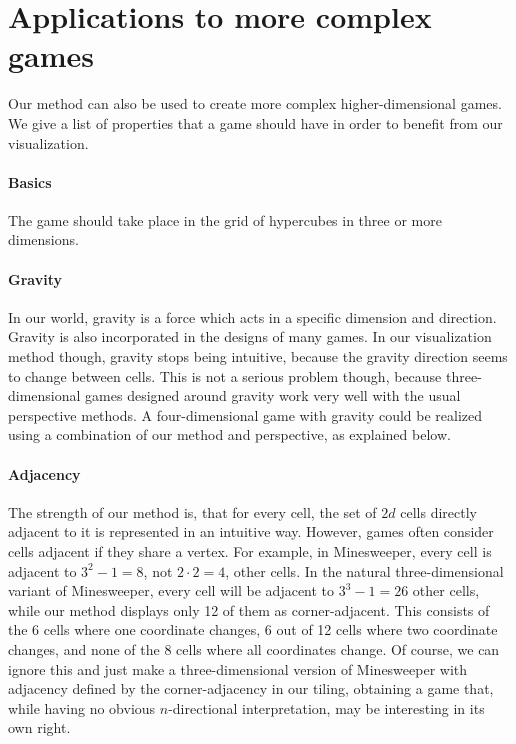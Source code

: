 \documentclass{article}
\begin{document}
\section{Applications to more complex games}

Our method can also be used to create more complex higher-dimensional games.
We give a list of properties that a game should have in order to benefit from our visualization.

\paragraph{Basics} The game should take place in the grid of hypercubes in three or more dimensions.

\paragraph{Gravity} In our world, gravity is a force which acts in a specific dimension and direction.
Gravity is also incorporated in the designs of many games. In our visualization method though, gravity
stops being intuitive, because the gravity direction seems to change between cells. This is not a
serious problem though, because three-dimensional games designed around gravity work very well with the usual
perspective methods. A four-dimensional game with gravity could be realized using a combination of our method and
perspective, as explained below.

\paragraph{Adjacency} The strength of our method is, that for every cell, the set of $2d$ cells directly adjacent
to it is represented in an intuitive way. However, games often consider cells adjacent if they share a vertex.
For example, in Minesweeper, every cell is adjacent to $3^2-1 = 8$, not $2\cdot 2=4$, other cells. In the natural
three-dimensional variant of Minesweeper, every cell will be adjacent to $3^3-1 = 26$ other cells, while our
method displays only 12 of them as corner-adjacent. This consists of the 6 cells where one coordinate changes,
6 out of 12 cells where two coordinate changes, and none of the 8 cells where all coordinates change. Of course, we
can ignore this and just make a three-dimensional version of Minesweeper with adjacency defined by the corner-adjacency
in our tiling, obtaining a game that, while having no obvious $n$-directional interpretation, may be interesting
in its own right.
\end{document}
